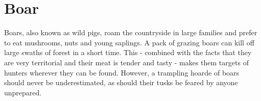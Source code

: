\section{Boar}

Boars, also known as wild pigs, roam the countryside in large families and prefer to eat mushrooms, nuts and young saplings. A pack of grazing boars can kill off large swaths of forest in a short time. This - combined with the facts that they are very territorial and their meat is tender and tasty - makes them targets of hunters wherever they can be found. However, a trampling hoarde of boars should never be underestimated, as should their tusks be feared by anyone unprepared.